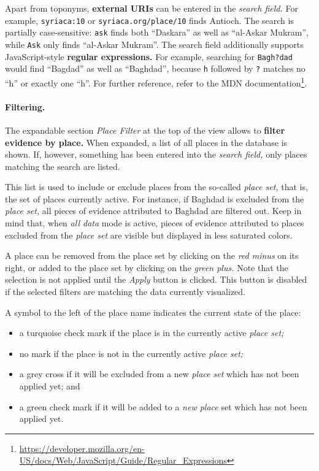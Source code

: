 Apart from toponyms, \textbf{external URIs} can be entered in the \emph{search field.}
For example, \verb!syriaca:10! or \verb!syriaca.org/place/10! finds Antioch.
The search is partially case-sensitive:
\verb!ask! finds both \enquote{Daskara} as well as \enquote{al-Askar Mukram}, while \verb!Ask! only finds \enquote{al-Askar Mukram}.
The search field additionally supports JavaScript-style \textbf{regular expressions.}
For example, searching for \verb!Bagh?dad! would find \enquote{Bagdad} as well as \enquote{Baghdad}, because \verb!h! followed by \verb!?! matches no \enquote{h} or exactly one \enquote{h}.
For further reference, refer to the MDN documentation\footnote{\url{https://developer.mozilla.org/en-US/docs/Web/JavaScript/Guide/Regular_Expressions}}.

\paragraph{Filtering.}
The expandable section \emph{Place Filter} at the top of the view allows to \textbf{filter evidence by place.}
When expanded, a list of all places in the database is shown.
If, however, something has been entered into the \emph{search field,} only places matching the search are listed.

This list is used to include or exclude places from the so-called \emph{place set,}
that is, the set of places currently active.
For instance, if Baghdad is excluded from the \emph{place set,} all pieces of evidence attributed to Baghdad are filtered out.
Keep in mind that, when \emph{all data} mode is active, pieces of evidence attributed to places excluded from the \emph{place set} are visible but displayed in less saturated colors.

A place can be removed from the place set by clicking on the \emph{red minus} on its right, or added to the place set by clicking on the \emph{green plus.}
Note that the selection is not applied until the \emph{Apply} button is clicked.
This button is disabled if the selected filters are matching the data currently visualized.

A symbol to the left of the place name indicates the current state of the place:

\begin{itemize}
  \item a turquoise check mark if the place is in the currently active \emph{place set;}
  \item no mark if the place is not in the currently active \emph{place set;}
  \item a grey cross if it will be excluded from a new \emph{place set} which has not been applied yet; and
  \item a green check mark if it will be added to a \emph{new place} set which has not been applied yet.
\end{itemize}


